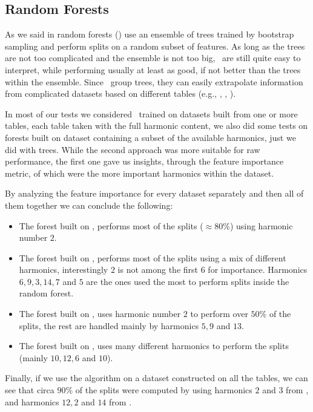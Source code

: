 \subsection{Random Forests}
As we said in  random forests (\rfs) use an ensemble of trees trained by bootstrap
sampling and perform splits on a random subset of features. As long as the trees are not too
complicated and the ensemble is not too big, \rfs\ are still quite easy to interpret, while
performing usually at least as good, if not better than the trees within the ensemble. Since \rfs\
group trees, they can easily extrapolate information from complicated datasets based on different
tables (e.g., \an, \bn, \cnmod).

In most of our tests we considered \rfs\ trained on datasets built from one or more tables, each
table taken with the full harmonic content, we also did some tests on forests built on dataset
containing a subset of the available harmonics, just we did with trees. While the second approach
was more suitable for raw performance, the first one gave us insights, through the feature
importance metric, of which were the more important harmonics within the dataset.

By analyzing the feature importance for every dataset separately and then all of them together we
can conclude the following:
\begin{itemize}
	\item The forest built on \an, performs most of the splits ($\approx 80\%$) using harmonic
	      number $2$.
	\item The forest built on \bn, performs most of the splits using a mix of different
	      harmonics, interestingly $2$ is not among the first $6$ for importance. Harmonics
	      $6, 9, 3, 14, 7$ and $5$ are the ones used the most to perform splits inside the
	      random forest.
	\item The forest built on \cnmod, uses harmonic number $2$ to perform over $50\%$ of the
	      splits, the rest are handled mainly by harmonics $5, 9$ and $13$.
	\item The forest built on \phin, uses many different harmonics to perform the splits (mainly
	      $10, 12, 6$ and $10$).
\end{itemize}
Finally, if we use the algorithm on a dataset constructed on all the tables, we can see that circa
$90\%$ of the splits were computed by using harmonics $2$ and $3$ from \cnmod, and harmonics $12, 2$
and $14$ from \an.

